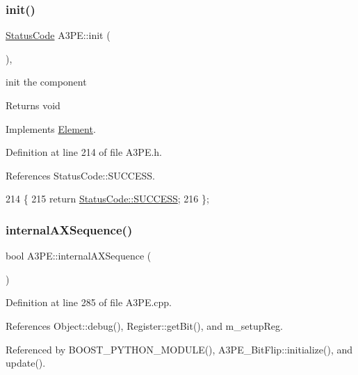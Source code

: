 \subsubsection{\texorpdfstring{init()}{init()}}
{\footnotesize\ttfamily \hyperlink{classStatusCode}{Status\+Code} A3\+P\+E\+::init (\begin{DoxyParamCaption}{ }\end{DoxyParamCaption})\hspace{0.3cm}{\ttfamily [inline]}, {\ttfamily [virtual]}}

init the component

\begin{DoxyReturn}{Returns}
void 
\end{DoxyReturn}


Implements \hyperlink{classElement_af42754b5cabc198869222725218d695c}{Element}.



Definition at line 214 of file A3\+P\+E.\+h.



References Status\+Code\+::\+S\+U\+C\+C\+E\+SS.


\begin{DoxyCode}
214                     \{
215     \textcolor{keywordflow}{return} \hyperlink{classStatusCode_a6f565cbeadc76d14c72f047e5e85eb4badd0da38d3ba0d922efd1f4619bc37ad8}{StatusCode::SUCCESS};
216   \};
\end{DoxyCode}
\mbox{\label{classA3PE_a4b9cf42bdd0a14e48807faa0956c59bd}} 
\subsubsection{\texorpdfstring{internal\+A\+X\+Sequence()}{internalAXSequence()}}
{\footnotesize\ttfamily bool A3\+P\+E\+::internal\+A\+X\+Sequence (\begin{DoxyParamCaption}{ }\end{DoxyParamCaption})}



Definition at line 285 of file A3\+P\+E.\+cpp.



References Object\+::debug(), Register\+::get\+Bit(), and m\+\_\+setup\+Reg.



Referenced by B\+O\+O\+S\+T\+\_\+\+P\+Y\+T\+H\+O\+N\+\_\+\+M\+O\+D\+U\+L\+E(), A3\+P\+E\+\_\+\+Bit\+Flip\+::initialize(), and update().


